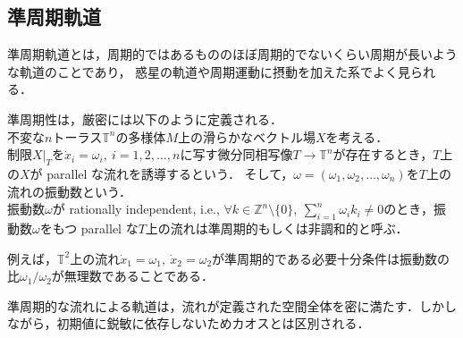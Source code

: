 \documentclass[../main]{subfiles}
\begin{document}
\subsection{準周期軌道}
準周期軌道とは，周期的ではあるもののほぼ周期的でないくらい周期が長いような軌道のことであり，
惑星の軌道や周期運動に摂動を加えた系でよく見られる．

準周期性は，厳密には以下のように定義される\cite{Broer1996}．\\
不変な$n$トーラス$\mathbb{T}^n$の多様体$M$上の滑らかなベクトル場$X$を考える．\\
制限$X|_T$を$\dot{x}_i=\omega_i,\ i=1,2,\ldots ,n$に写す微分同相写像$T\to \mathbb{T}^n$が存在するとき，$T$上の$X$が parallel な流れを誘導するという．
そして，$\omega=(\omega_1,\omega_2,\ldots,\omega_n)$を$T$上の流れの振動数という．\\
振動数$\omega$が rationally independent, i.e., $\forall k\in\mathbb{Z}^n\setminus \{0\},\ \sum_{i=1}^n\omega_ik_i\neq 0$のとき，振動数$\omega$をもつ parallel な$T$上の流れは準周期的もしくは非調和的と呼ぶ．

例えば，$\mathbb{T}^2$上の流れ$\dot{x}_1=\omega_1,\ \dot{x}_2=\omega_2$が準周期的である必要十分条件は振動数の比$\omega_1/\omega_2$が無理数であることである．

準周期的な流れによる軌道は，流れが定義された空間全体を密に満たす．しかしながら，初期値に鋭敏に依存しないためカオスとは区別される．
\end{document}
